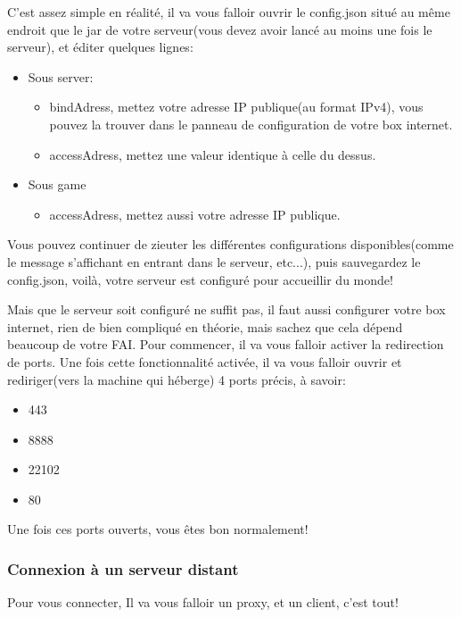 \documentclass{article}
\begin{document}
C'est assez simple en réalité, il va vous falloir ouvrir le config.json situé au même endroit que le jar de votre serveur(vous devez avoir lancé au moins une fois le serveur), et éditer quelques lignes:
\begin{itemize}
	\item Sous server:
		\begin{itemize}
			\item bindAdress, mettez votre adresse IP publique(au format IPv4), vous pouvez la trouver dans le panneau de configuration de votre box internet.
			\item accessAdress, mettez une valeur identique à celle du dessus.
		\end{itemize}
	\item Sous game
		\begin{itemize}
			\item accessAdress, mettez aussi votre adresse IP publique.
		\end{itemize}
\end{itemize}
Vous pouvez continuer de zieuter les différentes configurations disponibles(comme le message s'affichant en entrant dans le serveur, etc...), puis sauvegardez le config.json, voilà, votre serveur est configuré pour accueillir du monde!\newline

Mais que le serveur soit configuré ne suffit pas, il faut aussi configurer votre box internet, rien de bien compliqué en théorie, mais sachez que cela dépend beaucoup de votre FAI.\newline
Pour commencer, il va vous falloir activer la redirection de ports. Une fois cette fonctionnalité activée, il va vous falloir ouvrir et rediriger(vers la machine qui héberge) 4 ports précis, à savoir:
\begin{itemize}
	\item 443
	\item 8888
	\item 22102
	\item 80
\end{itemize}
Une fois ces ports ouverts, vous êtes bon normalement!

\subsubsection{Connexion à un serveur distant}
Pour vous connecter, Il va vous falloir un proxy, et un client, c'est tout!\newline\newline
\end{document}
